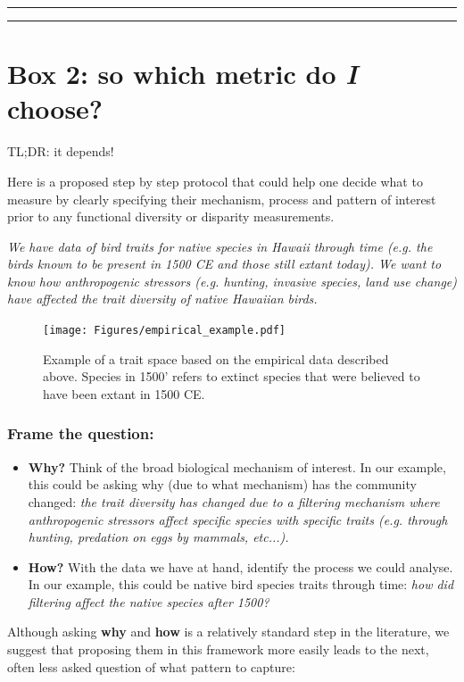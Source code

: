 \documentclass[12pt,letterpaper]{article}
\begin{document}
\bigskip
\bigskip
\hrule
\hrule

\section*{Box 2: so which metric do \textit{I} choose?}

TL;DR: it depends!

Here is a proposed step by step protocol that could help one decide what to measure by clearly specifying their mechanism, process and pattern of interest prior to any functional diversity or disparity measurements.

\textit{We have data of bird traits for native species in Hawaii through time (e.g. the birds known to be present in 1500 CE and those still extant today).
We want to know how anthropogenic stressors (e.g. hunting, invasive species, land use change) have affected the trait diversity of native Hawaiian birds.}

\begin{figure}[!htbp]
\centering
   \texttt{[image: Figures/empirical\_example.pdf]}
\caption{Example of a trait space based on the empirical data described above. Species in 1500' refers to extinct species that were believed to have been extant in 1500 CE.}
\label{Fig:trait_space_example}
\end{figure}
\bigskip

\subsubsection{Frame the question:}

\begin{itemize}

    \item \textbf{Why?} Think of the broad biological mechanism of interest. In our example, this could be asking why (due to what mechanism) has the community changed: \textit{the trait diversity has changed due to a filtering mechanism where anthropogenic stressors affect specific species with specific traits (e.g. through hunting, predation on eggs by mammals, etc...).}
    \item \textbf{How?} With the data we have at hand, identify the process we could analyse. In our example, this could be native bird species traits through time: \textit{how did filtering affect the native species after 1500?}

\end{itemize}

Although asking \textbf{why} and \textbf{how} is a relatively standard step in the literature, we suggest that proposing them in this framework more easily leads to the next, often less asked question of what pattern to capture:
\end{document}
